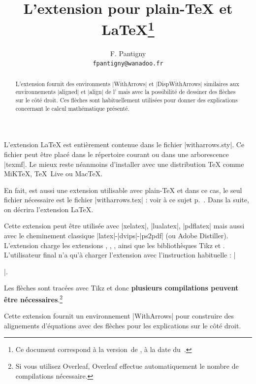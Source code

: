 \documentclass[dvipsnames]{article}%
\begin{document}
\VerbatimFootnotes

\title{L'extension  pour plain-TeX et LaTeX\thanks{Ce document correspond à la 
version~\myfileversion\space de , à la date du~\myfiledate.}} 
\author{F. Pantigny \\ \texttt{fpantigny@wanadoo.fr}}  

\maketitle

\begin{abstract}
L'extension  fournit des environments |{WithArrows}| et
|{DispWithArrows}| similaires aux environnements |{aligned}| et |{align}| de
l' mais avec la possibilité de dessiner des flèches sur le côté droit.
Ces flèches sont habituellement utilisées pour donner des explications concernant 
le calcul mathématique présenté. 
\end{abstract}


\vspace{1cm}
L'extension LaTeX  est entièrement contenue dans le fichier |witharrows.sty|. Ce
fichier peut être placé dans le répertoire courant ou dans une arborescence |texmf|. Le mieux reste néanmoins
d'installer  avec une distribution TeX comme MiKTeX, TeX~Live ou MacTeX.

\medskip
En fait,  est aussi une extension utilisable avec plain-TeX et dans ce cas, le seul fichier
nécessaire est le fichier |witharrows.tex| : voir à ce sujet p.~\pageref{plain-TeX}. Dans la suite, on décrira
l'extension LaTeX.

\medskip
Cette extension peut être utilisée avec |xelatex|, |lualatex|, |pdflatex| mais aussi avec le cheminement classique
|latex|-|dvips|-|ps2pdf| (ou Adobe Distiller). L'extension  charge les extensions ,
, ,  ainsi que les bibliothèques Tikz  et . L'utilisateur final n'a qu'à charger l'extension  avec
l'instruction habituelle : |\usepackage{witharrows}|. 

\medskip
Les flèches sont tracées avec Tikz et donc \textbf{plusieurs compilations peuvent être nécessaires}.\footnote{Si
  vous utilisez Overleaf, Overleaf effectue automatiquement le nombre de compilations nécessaire.}

\bigskip
Cette extension fournit un environnement |{WithArrows}| pour construire des alignements d'équations
avec des flèches pour les explications sur le côté droit.
\end{document}

